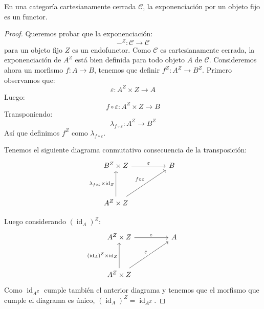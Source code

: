 \documentclass[12pt, twoside]{book}
\newcommand{\cat}{{\mathcal{C}}}
\DeclareMathOperator{\id}{id}
\begin{document}
\begin{lemma}
En una categoría cartesianamente cerrada $\cat$, la exponenciación por un objeto fijo es un functor.
\end{lemma}
\begin{proof}
Queremos probar que la exponenciación:
\[ -^Z \colon \cat \to \cat \]
para un objeto fijo $Z$ es un endofunctor.
Como $\cat$ es cartesianamente cerrada, la exponenciación de $A^Z$ está bien definida para todo objeto $A$ de $\cat$.
Consideremos ahora un morfismo $f \colon A \to B$, tenemos que definir $f^Z \colon A^Z \to B^Z$.
Primero observamos que:
\[ \varepsilon \colon A^Z \times Z \to A \]
Luego:
\[ f \circ \varepsilon \colon A^Z \times Z \to B\]
Transponiendo:
\[ \lambda_{f \circ \varepsilon} \colon A^Z \to B^Z \]
Así que definimos $f^Z$ como $\lambda_{f \circ \varepsilon}$.

Tenemos el siguiente diagrama conmutativo consecuencia de la transposición:
\[
\begin{tikzcd}
B^Z \times Z \arrow[rr,"\varepsilon"] & & B \\\\
A^Z \times Z \arrow[uu,"\lambda_{f\circ \varepsilon}\times\id_Z"]  \arrow[uurr,"f \circ \varepsilon"]
\end{tikzcd}
\]

Luego considerando $(\id_A)^Z$:
\[
\begin{tikzcd}
A^Z \times Z \arrow[rr,"\varepsilon"] & & A \\\\
A^Z \times Z \arrow[uu,"(\id_A)^Z\times\id_Z"]  \arrow[uurr,"\varepsilon"]
\end{tikzcd}
\]
Como $\id_{A^Z}$ cumple también el anterior diagrama y tenemos que el morfismo que cumple el diagrama es único, $(\id_A)^Z = \id_{A^Z}$.


\end{proof}
\end{document}
